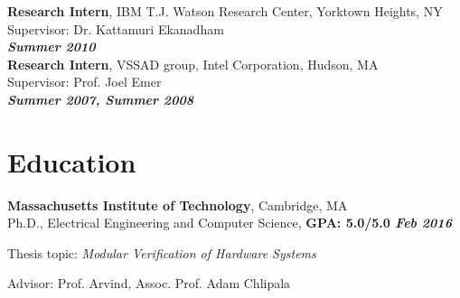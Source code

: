 \documentclass[margin]{resume}
\begin{document}
\begin{resume}
    \textbf{Research Intern}, IBM T.J. Watson Research Center, Yorktown Heights, NY\\ 
    Supervisor: Dr. Kattamuri Ekanadham \\
\hfill \textbf{\textit{Summer 2010}}\\

    \textbf{Research Intern}, VSSAD group, Intel Corporation, Hudson, MA\\
    Supervisor: Prof. Joel Emer \\
\hfill \textbf{\textit{Summer 2007, Summer 2008}}\\
    \section{\mysidestyle Education}
    \textbf{Massachusetts Institute of Technology}, Cambridge, MA \\
    Ph.D., Electrical Engineering and Computer Science, \hfill \textbf{GPA: 5.0/5.0 \textit{Feb 2016}}\\
    \begin{list2}
        \item Thesis topic: \textit{Modular Verification of Hardware Systems}
        \item Advisor:  Prof. Arvind, Assoc. Prof. Adam Chlipala


\end{list2}
\end{resume}
\end{document}
